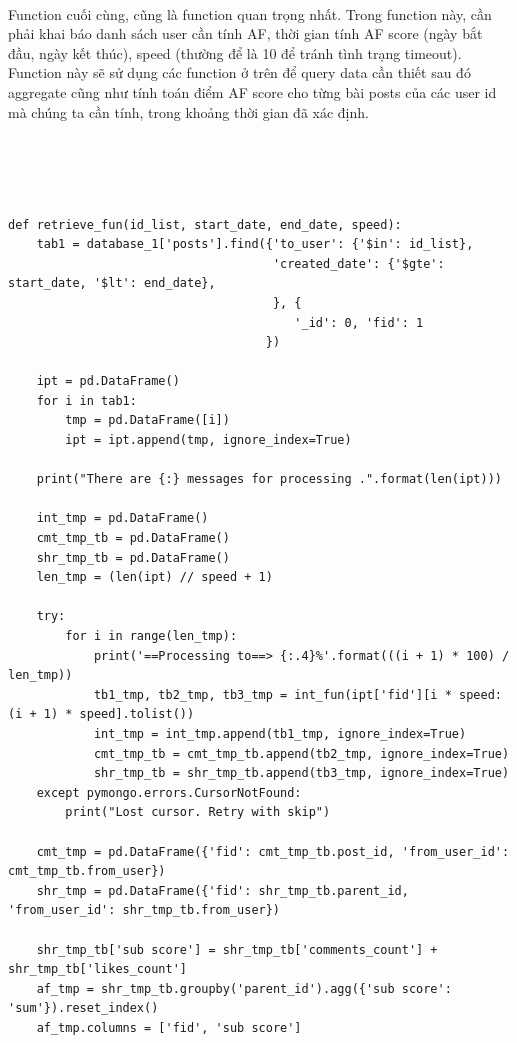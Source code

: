 \documentclass[12pt]{article}
\numberwithin{equation}{section}
\begin{document}
\paragraph{} Function cuối cùng, cũng là function quan trọng nhất. Trong function này, cần phải khai báo danh sách user cần tính AF, thời gian tính AF score (ngày bắt đầu, ngày kết thúc), speed (thường để là 10 để tránh tình trạng timeout). Function này sẽ sử dụng các function ở trên để query data cần thiết sau đó aggregate cũng như tính toán điểm AF score cho từng bài posts của các user id mà chúng ta cần tính, trong khoảng thời gian đã xác định.
\\
\\
\\
\\
\\
\begin{lstlisting}
def retrieve_fun(id_list, start_date, end_date, speed):
    tab1 = database_1['posts'].find({'to_user': {'$in': id_list},
                                     'created_date': {'$gte': start_date, '$lt': end_date},
                                     }, {
                                        '_id': 0, 'fid': 1
                                    })

    ipt = pd.DataFrame()
    for i in tab1:
        tmp = pd.DataFrame([i])
        ipt = ipt.append(tmp, ignore_index=True)

    print("There are {:} messages for processing .".format(len(ipt)))

    int_tmp = pd.DataFrame()
    cmt_tmp_tb = pd.DataFrame()
    shr_tmp_tb = pd.DataFrame()
    len_tmp = (len(ipt) // speed + 1)

    try:
        for i in range(len_tmp):
            print('==Processing to==> {:.4}%'.format(((i + 1) * 100) / len_tmp))
            tb1_tmp, tb2_tmp, tb3_tmp = int_fun(ipt['fid'][i * speed:(i + 1) * speed].tolist())
            int_tmp = int_tmp.append(tb1_tmp, ignore_index=True)
            cmt_tmp_tb = cmt_tmp_tb.append(tb2_tmp, ignore_index=True)
            shr_tmp_tb = shr_tmp_tb.append(tb3_tmp, ignore_index=True)
    except pymongo.errors.CursorNotFound:
        print("Lost cursor. Retry with skip")

    cmt_tmp = pd.DataFrame({'fid': cmt_tmp_tb.post_id, 'from_user_id': cmt_tmp_tb.from_user})
    shr_tmp = pd.DataFrame({'fid': shr_tmp_tb.parent_id, 'from_user_id': shr_tmp_tb.from_user})

    shr_tmp_tb['sub score'] = shr_tmp_tb['comments_count'] + shr_tmp_tb['likes_count']
    af_tmp = shr_tmp_tb.groupby('parent_id').agg({'sub score': 'sum'}).reset_index()
    af_tmp.columns = ['fid', 'sub score']


\end{lstlisting}
\end{document}
